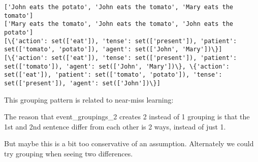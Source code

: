 \documentclass[11pt]{article}
\begin{document}
    \begin{Verbatim}[commandchars=\\\{\}]
['John eats the potato', 'John eats the tomato', 'Mary eats the tomato']
['Mary eats the tomato', 'John eats the tomato', 'John eats the potato']
[\{'action': set(['eat']), 'tense': set(['present']), 'patient': set(['tomato', 'potato']), 'agent': set(['John', 'Mary'])\}]
[\{'action': set(['eat']), 'tense': set(['present']), 'patient': set(['tomato']), 'agent': set(['John', 'Mary'])\}, \{'action': set(['eat']), 'patient': set(['tomato', 'potato']), 'tense': set(['present']), 'agent': set(['John'])\}]

    \end{Verbatim}

    This grouping pattern is related to near-miss learning:

The reason that event\_groupings\_2 creates 2 instead of 1 grouping is
that the 1st and 2nd sentence differ from each other is 2 ways, instead
of just 1.

But maybe this is a bit too conservative of an assumption. Alternately
we could try grouping when seeing two differences.
\end{document}
